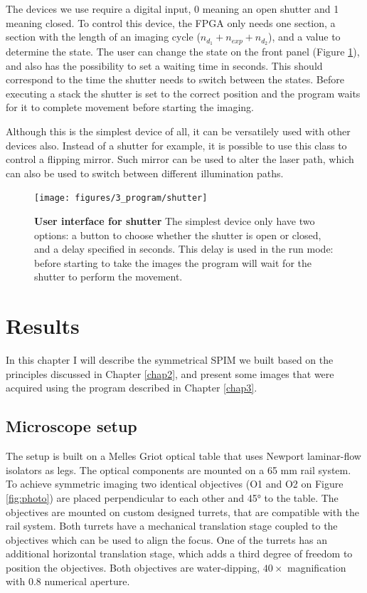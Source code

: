 \documentclass{tdk_style}
\begin{document}
The devices we use require a digital input, 0 meaning an open shutter and 1 meaning closed. To control this device, the FPGA only needs one section, a section with the length of an imaging cycle ($n_{d_1}+n_{exp}+n_{d_2}$), and a value to determine the state. The user can change the state on the front panel (Figure \ref{fig:ui_shutter}), and also has the possibility to set a waiting time in seconds. This should correspond to the time the shutter needs to switch between the states. Before executing a stack the shutter is set to the correct position and the program waits for it to complete movement before starting the imaging.

Although this is the simplest device of all, it can be versatilely used with other devices also. Instead of a shutter for example, it is possible to use this class to control a flipping mirror. Such mirror can be used to alter the laser path, which can also be used to switch between different illumination paths.

\begin{figure}[htbp]
	\centering
	\texttt{[image: figures/3\_program/shutter]}
	\caption{\textbf{User interface for shutter} The simplest device only have two options: a button to choose whether the shutter is open or closed, and a delay specified in seconds. This delay is used in the run mode: before starting to take the images the program will wait for the shutter to perform the movement.}
	\label{fig:ui_shutter}
\end{figure}







\chapter{Results}
\label{chap4}

In this chapter I will describe the symmetrical SPIM we built based on the principles discussed in Chapter \ref{chap2}, and present some images that were acquired using the program described in Chapter \ref{chap3}.

\section{Microscope setup}
The setup is built on a Melles Griot optical table that uses Newport laminar-flow isolators as legs. The optical components are mounted on a 65 mm rail system. To achieve symmetric imaging two identical objectives (O1 and O2 on Figure \ref{fig:photo}) are placed perpendicular to each other and 45° to the table. The objectives are mounted on custom designed turrets, that are compatible with the rail system. Both turrets have a mechanical translation stage coupled to the objectives which can be used to align the focus. One of the turrets has an additional horizontal translation stage, which adds a third degree of freedom to position the objectives. Both objectives are water-dipping, $40\times$ magnification with 0.8 numerical aperture.
\end{document}
